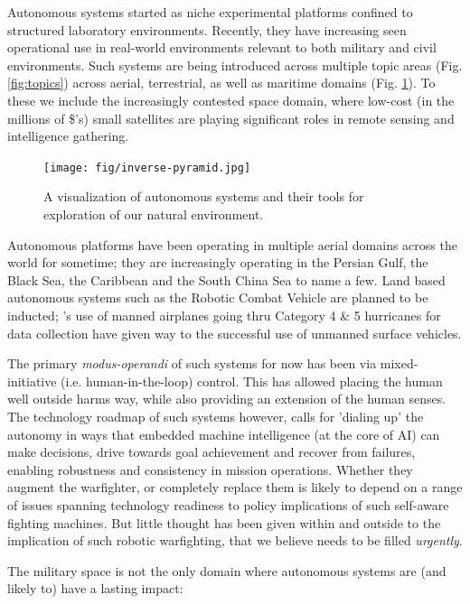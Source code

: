 \documentclass[11pt,letterpaper]{article}
\begin{document}
Autonomous systems started as niche experimental platforms confined to
structured laboratory environments. Recently, they have increasing
seen operational use in real-world environments relevant to both
military and civil environments. Such systems are being introduced
across multiple topic areas (Fig. \ref{fig:topics}) across aerial,
terrestrial, as well as maritime domains (Fig. \ref{fig:inverse}). To
these we include the increasingly contested space domain, where
low-cost (in the millions of \$'s) small satellites are playing
significant roles in remote sensing and intelligence gathering.

\begin{figure}  
  \centering 
  \texttt{[image: fig/inverse-pyramid.jpg]} 
  \caption{A visualization of autonomous systems and their tools for
    exploration of our natural environment.}
  \label{fig:inverse}
\end{figure}

Autonomous platforms have been operating in multiple aerial domains
across the world for sometime; they are increasingly operating in the
Persian Gulf, the Black Sea, the Caribbean and the South China Sea to
name a few. Land based autonomous systems such as the Robotic Combat
Vehicle are planned to be inducted; \noae's use of manned airplanes
going thru Category 4 \& 5 hurricanes for data collection have given
way to the successful use of unmanned surface vehicles.

The primary \emph{modus-operandi} of such systems for now has been via
mixed-initiative (i.e. human-in-the-loop) control. This has allowed
placing the human well outside harms way, while also providing an
extension of the human senses. The technology roadmap of such systems
however, calls for 'dialing up' the autonomy in ways that embedded
machine intelligence (at the core of AI) can make decisions, drive
towards goal achievement and recover from failures, enabling
robustness and consistency in mission operations. Whether they augment
the warfighter, or completely replace them is likely to depend on a
range of issues spanning technology readiness to policy implications
of such self-aware fighting machines. But little thought has been
given within and outside \org to the implication of such robotic
warfighting, that we believe needs to be filled \emph{urgently}.

\pagebreak

The military space is not the only domain where autonomous systems are
(and likely to) have a lasting impact:
\end{document}
